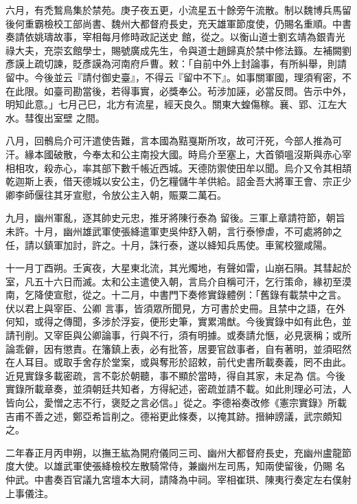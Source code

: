 \begin{pinyinscope}
 六月，有禿鶖鳥集於禁苑。庚子夜五更，小流星五十餘旁午流散。制以魏博兵馬留後何重霸檢校工部尚書、魏州大都督府長史，充天雄軍節度使，仍賜名重順。中書奏請依姚璹故事，宰相每月修時政記送史
 館，從之。以衡山道士劉玄靖為銀青光祿大夫，充崇玄館學士，賜號廣成先生，令與道士趙歸真於禁中修法籙。左補闕劉彥謨上疏切諫，貶彥謨為河南府戶曹。敕：「自前中外上封論事，有所糾舉，則請留中。今後並云『請付御史臺』，不得云『留中不下』。如事關軍國，理須宥密，不在此限。如臺司勘當後，若得事實，必獎奉公。茍涉加誣，必當反問。告示中外，明知此意。」七月己巳，北方有流星，經天良久。關東大蝗傷稼。襄、郢、江左大水。彗復出室壁
 之間。



 八月，回鶻烏介可汗遣使告難，言本國為黠戛斯所攻，故可汗死，今部人推為可汗。緣本國破散，今奉太和公主南投大國。時烏介至塞上，大首領嗢沒斯與赤心宰相相攻，殺赤心，率其部下數千帳近西城。天德防禦使田牟以聞。烏介又令其相頡乾迦斯上表，借天德城以安公主，仍乞糧儲牛羊供給。詔金吾大將軍王會、宗正少卿李師偃往其牙宣慰，令放公主入朝，賑粟二萬石。



 九月，幽州軍亂，逐其帥史元忠，推牙將陳行泰為
 留後。三軍上章請符節，朝旨未許。十月，幽州雄武軍使張絳遣軍吏吳仲舒入朝，言行泰慘虐，不可處將帥之任，請以鎮軍加討，許之。十月，誅行泰，遂以絳知兵馬使。車駕校獵咸陽。



 十一月丁酉朔。壬寅夜，大星東北流，其光燭地，有聲如雷，山崩石隕。其彗起於室，凡五十六日而滅。太和公主遣使入朝，言烏介自稱可汗，乞行策命，緣初至漠南，乞降使宣慰，從之。十二月，中書門下奏修實錄體例：「舊錄有載禁中之言。伏以君上與宰臣、公卿
 言事，皆須眾所聞見，方可書於史冊。且禁中之語，在外何知，或得之傳聞，多涉於浮妄，便形史筆，實累鴻猷。今後實錄中如有此色，並請刊削。又宰臣與公卿論事，行與不行，須有明據。或奏請允愜，必見褒稱；或所論乖僻，因有懲責。在籓鎮上表，必有批答，居要官啟事者，自有著明，並須昭然在人耳目。或取手舍存於堂案，或與奪形於詔敕，前代史書所載奏義，罔不由此。近見實錄多載密疏，言不彰於朝聽，事不顯於當時，得自其家，未足為
 信。今後實錄所載章奏，並須朝廷共知者，方得紀述，密疏並請不載。如此則理必可法，人皆向公，愛憎之志不行，褒貶之言必信。」從之。李德裕奏改修《憲宗實錄》所載吉甫不善之述，鄭亞希旨削之。德裕更此條奏，以掩其跡。搢紳謗議，武宗頗知之。



 二年春正月丙申朔，以撫王紘為開府儀同三司、幽州大都督府長史，充幽州盧龍節度大使。以雄武軍使張絳檢校左散騎常侍，兼幽州左司馬，知兩使留後，仍賜
 名仲武。中書奏百官議九宮壇本大祠，請降為中祠。宰相崔珙、陳夷行奏定左右僕射上事儀注。




\end{pinyinscope}
